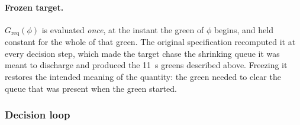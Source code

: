\paragraph{Frozen target.} $G_{\text{req}}(\phi)$ is evaluated \emph{once}, at the instant the green of
$\phi$ begins, and held constant for the whole of that green. The original specification recomputed it at
every decision step, which made the target chase the shrinking queue it was meant to discharge and produced
the 11~s greens described above. Freezing it restores the intended meaning of the quantity: the green needed
to clear the queue that was present when the green started.

\subsubsection{Decision loop}

